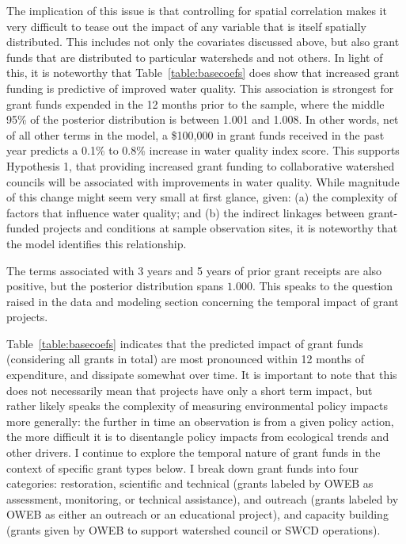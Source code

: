 \documentclass[12pt,a4paper,titlepage]{article}
\begin{document}
The implication of this issue is that controlling for spatial correlation makes it very difficult to tease out the impact of any variable that is itself spatially distributed. This includes not only the covariates discussed above, but also grant funds that are distributed to particular watersheds and not others. In light of this, it is noteworthy that Table~\ref{table:basecoefs} does show that increased grant funding is predictive of improved water quality. This association is strongest for grant funds expended in the 12 months prior to the sample, where the middle 95\% of the posterior distribution is between 1.001 and 1.008. In other words, net of all other terms in the model, a \$100,000 in grant funds received in the past year predicts a 0.1\% to 0.8\% increase in water quality index score. This supports Hypothesis 1, that providing increased grant funding to collaborative watershed councils will be associated with improvements in water quality. While magnitude of this change might seem very small at first glance, given: (a) the complexity of factors that influence water quality; and (b) the indirect linkages between grant-funded projects and conditions at sample observation sites, it is noteworthy that the model identifies this relationship.

The terms associated with 3 years and 5 years of prior grant receipts are also positive, but the posterior distribution spans $1.000$. This speaks to the question raised in the data and modeling section concerning the temporal impact of grant projects.

Table~\ref{table:basecoefs} indicates that the predicted impact of grant funds (considering all grants in total) are most pronounced within 12 months of expenditure, and dissipate somewhat over time. It is important to note that this does not necessarily mean that projects have only a short term impact, but rather likely speaks the complexity of measuring environmental policy impacts more generally: the further in time an observation is from a given policy action, the more difficult it is to disentangle policy impacts from ecological trends and other drivers. I continue to explore the temporal nature of grant funds in the context of specific grant types below. I break down grant funds into four categories: restoration, scientific and technical (grants labeled by OWEB as assessment, monitoring, or technical assistance), and outreach (grants labeled by OWEB as either an outreach or an educational project), and capacity building (grants given by OWEB to support watershed council or SWCD operations).
\end{document}
